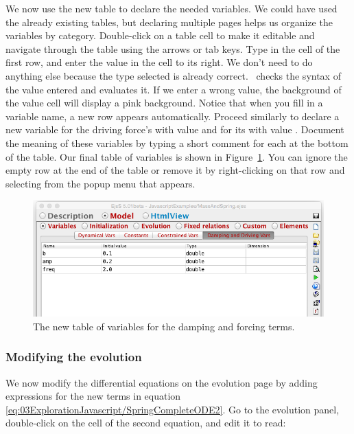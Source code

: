 We now use the new table to declare the needed variables. We could have used the already existing tables, but declaring multiple pages helps us organize the variables by category. Double-click on a table cell to make it editable and navigate through the table using the arrows or tab keys. Type  in the  cell of the first row, and enter the value  in the  cell to its right. We don't need to do anything else because the  type selected is already correct.
\ejs\ checks the syntax of the value entered and evaluates it. If we enter a wrong value, the background of the value cell will display a pink background.
Notice that when you fill in a variable name, a new row appears automatically. Proceed similarly to declare a new variable for the driving force's  with value  and for its  with value . Document the meaning of these variables by typing a short comment for each at the bottom of the table. Our final table of variables is shown in Figure~\ref{fig:03ExplorationJavascript/ModifyVariables2}.  You can ignore the empty row at the end of the table or remove it by right-clicking on that row and selecting  from the popup menu that appears.

\begin{figure}[htb]
    \centering
  \includegraphics[scale=\scale]{03ExplorationJavascript/images/ModifyVariables2.png}
    \caption{The new table of variables for the damping and forcing terms.}
    \label{fig:03ExplorationJavascript/ModifyVariables2}
\end{figure}

\subsubsection{Modifying the evolution}

We now modify the differential equations on the evolution page by adding expressions for the new terms in equation
\eqref{eq:03ExplorationJavascript/SpringCompleteODE2}. Go to the evolution panel, double-click on the  cell of the
second equation, and edit it to read:

